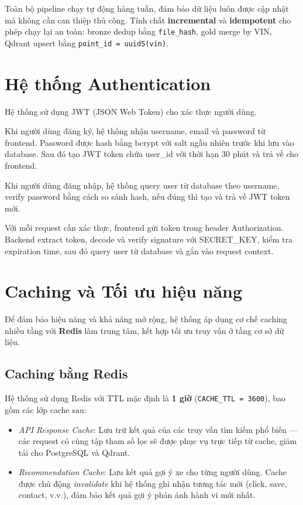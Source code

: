 Toàn bộ pipeline chạy tự động hàng tuần, đảm bảo dữ liệu luôn được cập nhật mà không cần can thiệp thủ công. Tính chất \textbf{incremental} và \textbf{idempotent} cho phép chạy lại an toàn: bronze dedup bằng \texttt{file\_hash}, gold merge by VIN, Qdrant upsert bằng \texttt{point\_id = uuid5(vin)}.

\section{Hệ thống Authentication}

Hệ thống sử dụng JWT (JSON Web Token) cho xác thực người dùng.

Khi người dùng đăng ký, hệ thống nhận username, email và password từ frontend. Password được hash bằng bcrypt với salt ngẫu nhiên trước khi lưu vào database. Sau đó tạo JWT token chứa user\_id với thời hạn 30 phút và trả về cho frontend.

Khi người dùng đăng nhập, hệ thống query user từ database theo username, verify password bằng cách so sánh hash, nếu đúng thì tạo và trả về JWT token mới.

Với mỗi request cần xác thực, frontend gửi token trong header Authorization. Backend extract token, decode và verify signature với SECRET\_KEY, kiểm tra expiration time, sau đó query user từ database và gắn vào request context.

\section{Caching và Tối ưu hiệu năng}

Để đảm bảo hiệu năng và khả năng mở rộng, hệ thống áp dụng cơ chế caching nhiều tầng với \textbf{Redis} làm trung tâm, kết hợp tối ưu truy vấn ở tầng cơ sở dữ liệu.

\subsection{Caching bằng Redis}

Hệ thống sử dụng Redis với TTL mặc định là \textbf{1 giờ} (\texttt{CACHE\_TTL = 3600}), bao gồm các lớp cache sau:

\begin{itemize}
    \item \textit{API Response Cache}: Lưu trữ kết quả của các truy vấn tìm kiếm phổ biến — các request có cùng tập tham số lọc sẽ được phục vụ trực tiếp từ cache, giảm tải cho PostgreSQL và Qdrant.
    \item \textit{Recommendation Cache}: Lưu kết quả gợi ý xe cho từng người dùng. Cache được chủ động \textit{invalidate} khi hệ thống ghi nhận tương tác mới (click, save, contact, v.v.), đảm bảo kết quả gợi ý phản ánh hành vi mới nhất.
\end{itemize}

